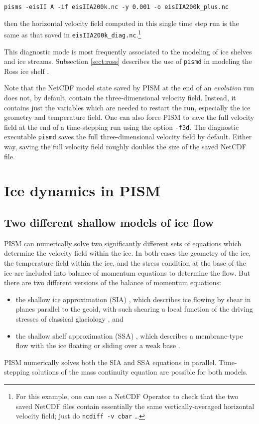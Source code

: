 \documentclass[11pt,final]{amsart}
\renewcommand{\t}[1]{\texttt{#1}}
\newcommand{\pismoptionindex}[1]{\index{options for PISM (and PETSc)!\texttt{-#1}}}
\newcommand{\intextoption}[1]{\texttt{-#1}\pismoptionindex{#1}}
\begin{document}
\verb|pisms -eisII A -if eisIIA200k.nc -y 0.001 -o eisIIA200k_plus.nc|

\noindent then the horizontal velocity field computed in this single time step run is the same as that saved in \verb|eisIIA200k_diag.nc|.\footnote{For this example, one can use a NetCDF Operator to check that the two saved NetCDF files contain essentially the same vertically-averaged horizontal velocity field; just do \t{ncdiff -v cbar} \dots}

This diagnostic mode is most frequently associated to the modeling of ice shelves and ice streams.  Subsection \ref{sect:ross} describes the use of \verb|pismd| in modeling the Ross ice shelf \cite{MacAyealetal}.

Note that the NetCDF model state saved by PISM at the end of an \emph{evolution} run does not, by default, contain the three-dimensional velocity field.  Instead, it contains just the variables which are needed to restart the run, especially the ice geometry and temperature field.  One can also force PISM to save the full velocity field at the end of a time-stepping run using the option \intextoption{f3d}.  The diagnostic executable \verb|pismd| saves the full three-dimensional velocity field by default.  Either way, saving the full velocity field roughly doubles the size of the saved NetCDF file.


\clearpage
\newpage
\section{Ice dynamics in PISM}\label{sect:dynamics}

\subsection{Two different shallow models of ice flow}  PISM can numerically solve two significantly different sets of equations which determine the velocity field within the ice.  In both cases the geometry of the ice, the temperature field within the ice, and the stress condition at the base of the ice are included into balance of momentum equations to determine the flow.  But there are two different versions of the balance of momentum equations:\begin{itemize}
\item the shallow ice approximation (SIA) \cite{Hutter}, which describes ice flowing by shear in planes parallel to the geoid, with such shearing a local function of the driving stresses of classical glaciology \cite{Paterson}, and
\item the shallow shelf approximation (SSA) \cite{WeisGreveHutter}, which describes a membrane-type flow with the ice floating or sliding over a weak base \cite{Morland,MacAyeal,SchoofStream}.
\end{itemize}
PISM numerically solves both the SIA and SSA equations in parallel.  Time-stepping solutions of the mass continuity equation are possible for both models.
\end{document}
